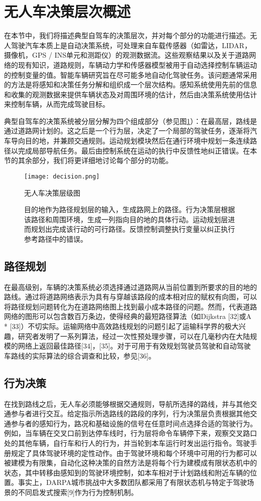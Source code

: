 \section{无人车决策层次概述}

在本节中，我们将描述典型自驾车的决策层次，并对每个部分的功能进行描述。无人驾驶汽车本质上是自动决策系统，可处理来自车载传感器（如雷达，LIDAR，摄像机，GPS / INS单元和测距仪）的观测数据流。这些观察结果以及关于道路网络的现有知识，道路规则，车辆动力学和传感器模型被用于自动选择控制车辆运动的控制变量的值。智能车辆研究旨在尽可能多地自动化驾驶任务。该问题通常采用的方法是将感知和决策任务分解和组织成一个层次结构。感知系统使用先前的信息和收集的观测数据来提供车辆状态及对周围环境的估计，然后由决策系统使用估计来控制车辆，从而完成驾驶目标。

典型自驾车的决策系统被分层分解为四个组成部分（参见图\ref{fig:decision}）：在最高层，路线是通过道路网计划的。这之后是一个行为层，决定了一个局部的驾驶任务，逐渐将汽车导向目的地，并兼顾交通规则。运动规划模块然后在通行环境中规划一条连续路径以完成局部导航任务。最后由控制系统在运动的执行中反馈性地纠正错误。在本节的其余部分，我们将更详细地讨论每个部分的功能。

\begin{figure}
\centering
\texttt{[image: decision.png]}
\caption{无人车决策层级图}
\caption*{目的地作为路径规划层的输入，生成路网上的路径。行为决策层根据该路径和周围环境，生成一列指向目的地的具体行动。运动规划层进而规划出完成该行动的可行路径。反馈控制调整执行变量以纠正执行参考路径中的错误。}
\label{fig:decision}
\end{figure}

\subsection{路径规划}
在最高级别，车辆的决策系统必须选择通过道路网从当前位置到所要求的目的地的路线。通过将道路网络表示为具有与穿越该路段的成本相对应的赋权有向图，可以将路径规划问题转化为在道路网络图上找到最小成本路径的问题。然而，代表道路网络的图形可以包含数百万条边，使得经典的最短路径算法（如Dijkstra [32]或A * [33]）不切实际。运输网络中高效路线规划的问题引起了运输科学界的极大兴趣，研究者发明了一系列算法，经过一次性预处理步骤，可以在几毫秒内在大陆规模的网络上返回最佳路径[34]，[35]。对于可用于有效规划驾驶员驾驶和自动驾驶车路线的实际算法的综合调查和比较，参见[36]。

\subsection{行为决策}
在找到路线之后，无人车必须能够根据交通规则，导航所选择的路线，并与其他交通参与者进行交互。给定指示所选路线的路段的序列，行为决策层负责根据其他交通参与者的感知行为，路况和基础设施的信号在任意时间点选择合适的驾驶行为。例如，当车辆在交叉口前到达停车线时，行为层将命令车辆停下来，观察交叉路口处的其他车辆，自行车和行人的行为，并当轮到本车运行时发出运行指令。驾驶手册规定了具体驾驶环境的定性动作。由于驾驶环境和每个环境中可用的行为都可以被建模为有限集，自动化这种决策的自然方法是将每个行为建模成有限状态机中的状态，其中转移由感知到的驾驶环境控制，如本车相对于计划路线和附近车辆的位置。事实上，DARPA城市挑战中大多数团队都采用了有限状态机与特定于驾驶场景的不同启发式搜索[9]作为行为控制机制。

